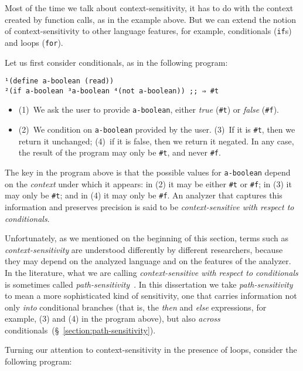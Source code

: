 \documentclass[12pt, oneside]{book}
\begin{document}
Most of the time we talk about context-sensitivity, it has to do with the context created by function calls, as in the example above. But we can extend the notion of context-sensitivity to other language features, for example, conditionals (\texttt{if}s) and loops (\texttt{for}).

Let us first consider conditionals, as in the following program:

\begin{Verbatim}
¹(define a-boolean (read))
²(if a-boolean ³a-boolean ⁴(not a-boolean)) ;; ⇒ #t
\end{Verbatim}

\begin{itemize}
  \item (1)~We ask the user to provide \texttt{a-boolean}, either \emph{true} (\texttt{\#t}) or \emph{false} (\texttt{\#f}).
  \item (2)~We condition on \texttt{a-boolean} provided by the user. (3)~If it is \texttt{\#t}, then we return it unchanged; (4)~if it is false, then we return it negated. In any case, the result of the program may only be \texttt{\#t}, and never \texttt{\#f}.
\end{itemize}

The key in the program above is that the possible values for \texttt{a-boolean} depend on the \emph{context} under which it appears: in (2) it may be either \texttt{\#t} or \texttt{\#f}; in (3) it may only be \texttt{\#t}; and in (4) it may only be \texttt{\#f}. An analyzer that captures this information and preserves precision is said to be \emph{context-sensitive with respect to conditionals}.

Unfortunately, as we mentioned on the beginning of this section, terms such as \emph{context-sensitivity} are understood differently by different researchers, because they may depend on the analyzed language and on the features of the analyzer. In the literature, what we are calling \emph{context-sensitive with respect to conditionals} is sometimes called \emph{path-sensitivity}~\cite{ecoop-16}. In this dissertation we take \emph{path-sensitivity} to mean a more sophisticated kind of sensitivity, one that carries information not only \emph{into} conditional branches (that is, the \emph{then} and \emph{else} expressions, for example, (3) and (4) in the program above), but also \emph{across} conditionals~(§~\ref{section:path-sensitivity}).

Turning our attention to context-sensitivity in the presence of loops, consider the following program:
\end{document}
